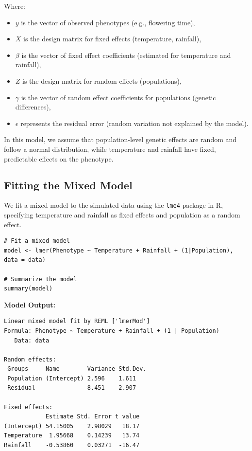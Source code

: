 \documentclass[12pt,a4paper]{article}
\begin{document}
Where:
\begin{itemize}
    \item \( y \) is the vector of observed phenotypes (e.g., flowering time),
    \item \( X \) is the design matrix for fixed effects (temperature, rainfall),
    \item \( \beta \) is the vector of fixed effect coefficients (estimated for temperature and rainfall),
    \item \( Z \) is the design matrix for random effects (populations),
    \item \( \gamma \) is the vector of random effect coefficients for populations (genetic differences),
    \item \( \epsilon \) represents the residual error (random variation not explained by the model).
\end{itemize}

In this model, we assume that population-level genetic effects are random and follow a normal distribution, while temperature and rainfall have fixed, predictable effects on the phenotype.

\subsection{Fitting the Mixed Model}

We fit a mixed model to the simulated data using the \texttt{lme4} package in R, specifying temperature and rainfall as fixed effects and population as a random effect.

\begin{verbatim}
# Fit a mixed model
model <- lmer(Phenotype ~ Temperature + Rainfall + (1|Population), data = data)

# Summarize the model
summary(model)
\end{verbatim}

\textbf{Model Output:}

\begin{verbatim}
Linear mixed model fit by REML ['lmerMod']
Formula: Phenotype ~ Temperature + Rainfall + (1 | Population)
   Data: data

Random effects:
 Groups     Name        Variance Std.Dev.
 Population (Intercept) 2.596    1.611   
 Residual               8.451    2.907   

Fixed effects:
            Estimate Std. Error t value
(Intercept) 54.15005    2.98029   18.17
Temperature  1.95668    0.14239   13.74
Rainfall    -0.53860    0.03271  -16.47
\end{verbatim}
\end{document}
